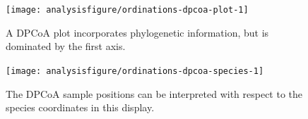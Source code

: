 \begin{knitrout}
\color{fgcolor}\begin{kframe}
\begin{alltt}
 \hlkwb{<-}   \hlstd{=} \hlstd{)}
\end{alltt}
\end{kframe}
\end{knitrout}

\begin{figure}
\begin{knitrout}
\color{fgcolor}\begin{kframe}
\begin{alltt}
 \hlkwb{<-} \hlopt{$}
  \hlstd{=} \hlstd{,}
                 \hlstd{=} \hlstd{)} \hlopt{+}
  \hlstd{(}\hlstd{(evals[}\hlstd{]} \hlopt{/} \hlstd{evals[}\hlstd{]))} \hlopt{+}
  \hlstd{(} \hlstd{=} \hlstd{,}  \hlstd{=} \hlstd{)}
\end{alltt}
\end{kframe}

{\centering \texttt{[image: analysisfigure/ordinations-dpcoa-plot-1]} 

}



\end{knitrout}
\caption{A DPCoA plot incorporates phylogenetic information, but is
  dominated by the first axis.}
\label{fig:ordinations-dpcoa}
\end{figure}

\begin{figure}
\begin{knitrout}
\color{fgcolor}\begin{kframe}
\begin{alltt}
  \hlstd{=} \hlstd{,}  \hlstd{=} \hlstd{)} \hlopt{+}
  \hlstd{(}\hlstd{(evals[}\hlstd{]} \hlopt{/} \hlstd{evals[}\hlstd{]))}
\end{alltt}
\end{kframe}

{\centering \texttt{[image: analysisfigure/ordinations-dpcoa-species-1]} 

}



\end{knitrout}
\caption{The DPCoA sample positions can be interpreted with respect to
  the species coordinates in this display.}
\label{fig:ordinations-dpcoa-species}
\end{figure}

